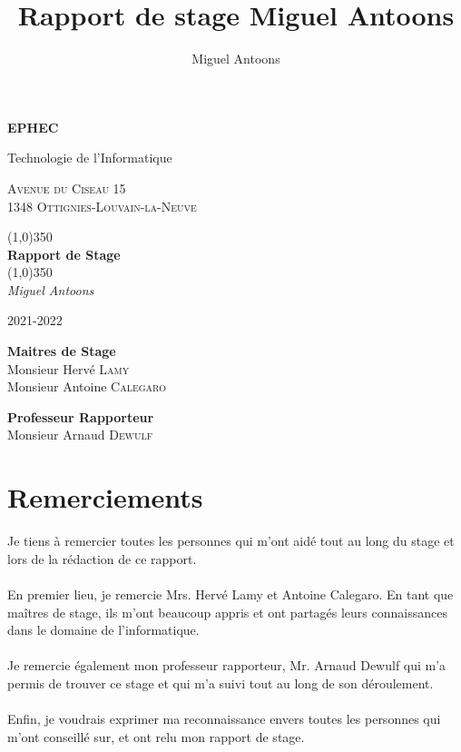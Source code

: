 \documentclass[11pt]{article}
\title{Rapport de stage Miguel Antoons}
\author{Miguel Antoons}
\begin{document}
\begin{titlepage}
    \begin{center}
        \LARGE
        \textbf{EPHEC}

        \vspace{0.1cm}
        \LARGE
        Technologie de l'Informatique

        \large
        \vspace{1.5cm}
        \textsc{Avenue du Ciseau 15}\\
        \textsc{1348 Ottignies-Louvain-la-Neuve}


        \line(1,0){350}\\
        \Huge
        \textbf{Rapport de Stage}\\
        \line(1,0){350}\\

        \vspace{0.5cm}
        \Large
        \textit{Miguel Antoons}

        \vspace{0.5cm}
        \large
        2021-2022

        \vspace{2.5cm}
        \large
        \textbf{Maitres de Stage}
        \vspace{0.2cm}\\
        Monsieur Hervé \textsc{Lamy}\\
        Monsieur Antoine \textsc{Calegaro}

        \vspace{2.5cm}
        \large
        \textbf{Professeur Rapporteur}
        \vspace{0.2cm}\\
        Monsieur Arnaud \textsc{Dewulf}


    \end{center}
\end{titlepage}

\tableofcontents

\newpage

\section{Remerciements}
Je tiens à remercier toutes les personnes qui m'ont aidé tout au long du stage et lors de la rédaction de ce rapport.\\
\\
En premier lieu, je remercie Mrs. Hervé Lamy et Antoine Calegaro. En tant que maîtres de stage, ils m'ont beaucoup appris et ont partagés leurs connaissances dans le domaine de l'informatique.\\
\\
Je remercie également mon professeur rapporteur, Mr. Arnaud Dewulf qui m'a permis de trouver ce stage et qui m'a suivi tout au long de son déroulement.\\
\\
Enfin, je voudrais exprimer ma reconnaissance envers toutes les personnes qui m'ont conseillé sur, et ont relu mon rapport de stage.
\end{document}
